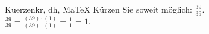 \begin{MAufgabe}{Kuerzen}{kr, dh, MaTeX}
K\"urzen Sie soweit m\"oglich: $\frac{39}{39}$.\\ 
\ifLsg\MLoesung
\quad $\frac{39}{39}=\frac{(39)\cdot(1)}{(39)\cdot(1)}=\frac{1}{1}=1$.\else\relax\fi
 \end{MAufgabe}